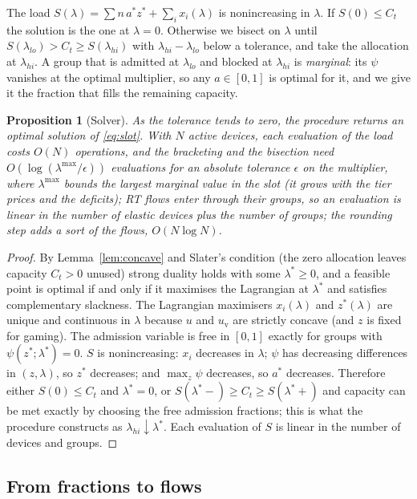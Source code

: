\documentclass[preprint,11pt]{elsarticle}
\newtheorem{proposition}{Proposition}
\theoremstyle{definition}
\theoremstyle{remark}
\begin{document}
The load $S(\lambda)=\sum n\,a^*z^*+\sum_i x_i(\lambda)$ is nonincreasing in $\lambda$.
If $S(0)\le C_t$ the solution is the one at $\lambda=0$.
Otherwise we bisect on $\lambda$ until $S(\lambda_{lo})>C_t\ge S(\lambda_{hi})$ with $\lambda_{hi}-\lambda_{lo}$ below a tolerance, and take the allocation at $\lambda_{hi}$.
A group that is admitted at $\lambda_{lo}$ and blocked at $\lambda_{hi}$ is \emph{marginal}: its $\psi$ vanishes at the optimal multiplier, so any $a\in[0,1]$ is optimal for it, and we give it the fraction that fills the remaining capacity.

\begin{proposition}[Solver]\label{prop:solver}
As the tolerance tends to zero, the procedure returns an optimal solution of \eqref{eq:slot}.
With $N$ active devices, each evaluation of the load costs $O(N)$ operations, and the bracketing and the bisection need $O(\log(\lambda^{\max}/\epsilon))$ evaluations for an absolute tolerance $\epsilon$ on the multiplier, where $\lambda^{\max}$ bounds the largest marginal value in the slot (it grows with the tier prices and the deficits); RT flows enter through their groups, so an evaluation is linear in the number of elastic devices plus the number of groups; the rounding step adds a sort of the flows, $O(N\log N)$.
\end{proposition}
\begin{proof}
By Lemma~\ref{lem:concave} and Slater's condition (the zero allocation leaves capacity $C_t>0$ unused) strong duality holds with some $\lambda^*\ge0$, and a feasible point is optimal if and only if it maximises the Lagrangian at $\lambda^*$ and satisfies complementary slackness.
The Lagrangian maximisers $x_i(\lambda)$ and $z^*(\lambda)$ are unique and continuous in $\lambda$ because $u$ and $u_{\mathrm{v}}$ are strictly concave (and $z$ is fixed for gaming).
The admission variable is free in $[0,1]$ exactly for groups with $\psi(z^*;\lambda^*)=0$.
$S$ is nonincreasing: $x_i$ decreases in $\lambda$; $\psi$ has decreasing differences in $(z,\lambda)$, so $z^*$ decreases; and $\max_z\psi$ decreases, so $a^*$ decreases.
Therefore either $S(0)\le C_t$ and $\lambda^*=0$, or $S(\lambda^*-)\ge C_t\ge S(\lambda^*+)$ and capacity can be met exactly by choosing the free admission fractions; this is what the procedure constructs as $\lambda_{hi}\downarrow\lambda^*$.
Each evaluation of $S$ is linear in the number of devices and groups.
\end{proof}

\subsection{From fractions to flows}
\end{document}
